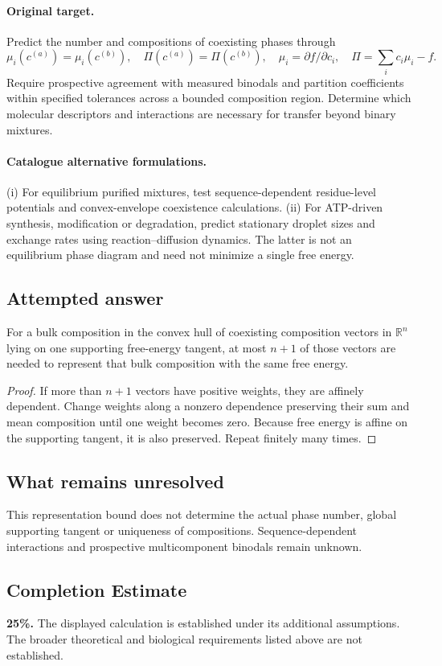 \documentclass[11pt]{article}
\begin{document}
\paragraph{Original target.}
Predict the number and compositions of coexisting phases through
\[\mu_i(c^{(a)})=\mu_i(c^{(b)}),\quad \Pi(c^{(a)})=\Pi(c^{(b)}),\quad \mu_i=\partial f/\partial c_i,\quad \Pi=\sum_i c_i\mu_i-f.\]
Require prospective agreement with measured binodals and partition coefficients within specified tolerances across a bounded composition region. Determine which molecular descriptors and interactions are necessary for transfer beyond binary mixtures.
\paragraph{Catalogue alternative formulations.}
(i) For equilibrium purified mixtures, test sequence-dependent residue-level potentials and convex-envelope coexistence calculations. (ii) For ATP-driven synthesis, modification or degradation, predict stationary droplet sizes and exchange rates using reaction--diffusion dynamics. The latter is not an equilibrium phase diagram and need not minimize a single free energy.
\subsection{Attempted answer}
\begin{proposition}
For a bulk composition in the convex hull of coexisting composition vectors in $\mathbb{R}^n$ lying on one supporting free-energy tangent, at most $n+1$ of those vectors are needed to represent that bulk composition with the same free energy.
\end{proposition}
\begin{proof}
If more than $n+1$ vectors have positive weights, they are affinely dependent. Change weights along a nonzero dependence preserving their sum and mean composition until one weight becomes zero. Because free energy is affine on the supporting tangent, it is also preserved. Repeat finitely many times.
\end{proof}
\subsection{What remains unresolved}
This representation bound does not determine the actual phase number, global supporting tangent or uniqueness of compositions. Sequence-dependent interactions and prospective multicomponent binodals remain unknown.
\subsection{Completion Estimate}
\textbf{25\%.} The displayed calculation is established under its additional assumptions. The broader theoretical and biological requirements listed above are not established.
\end{document}
